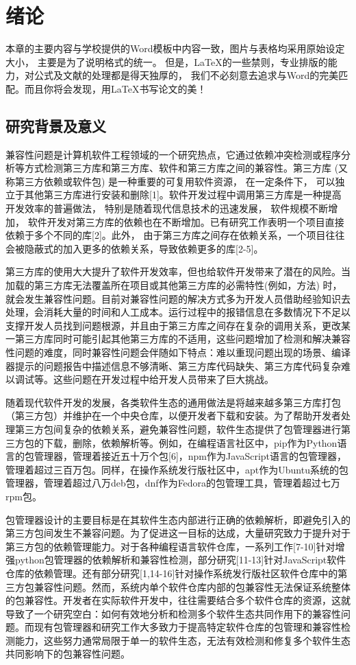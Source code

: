 \chapter{绪论}

本章的主要内容与学校提供的Word模板中内容一致，图片与表格均采用原始设定大小，%
主要是为了说明格式的统一。%
但是，\LaTeX{}的一些禁则，专业排版的能力，对公式及文献的处理都是得天独厚的，%
我们不必刻意去追求与Word的完美匹配。而且你将会发现，用\LaTeX{}书写论文的美！ %

\section{研究背景及意义}
兼容性问题是计算机软件工程领域的一个研究热点，它通过依赖冲突检测或程序分析等方式检测第三方库和第三方库、软件和第三方库之间的兼容性。第三方库 (又称第三方依赖或软件包) 是一种重要的可复用软件资源， 在一定条件下， 可以独立于其他第三方库进行安装和删除[1]。软件开发过程中调用第三方库是一种提高开发效率的普遍做法， 特别是随着现代信息技术的迅速发展， 软件规模不断增加， 软件开发对第三方库的依赖也在不断增加。已有研究工作表明一个项目直接依赖于多个不同的库[2]。此外， 由于第三方库之间存在依赖关系，一个项目往往会被隐蔽式的加入更多的依赖关系，导致依赖更多的库[2-5]。

第三方库的使用大大提升了软件开发效率，但也给软件开发带来了潜在的风险。当加载的第三方库无法覆盖所在项目或其他第三方库的必需特性(例如，方法) 时，就会发生兼容性问题。目前对兼容性问题的解决方式多为开发人员借助经验知识去处理，会消耗大量的时间和人工成本。运行过程中的报错信息在多数情况下不足以支撑开发人员找到问题根源，并且由于第三方库之间存在复杂的调用关系，更改某一第三方库同时可能引起其他第三方库的不适用，这些问题增加了检测和解决兼容性问题的难度，同时兼容性问题会伴随如下特点：难以重现问题出现的场景、编译器提示的问题报告中描述信息不够清晰、第三方库代码缺失、第三方库代码复杂难以调试等。这些问题在开发过程中给开发人员带来了巨大挑战。

随着现代软件开发的发展，各类软件生态的通用做法是将越来越多第三方库打包（第三方包）并维护在一个中央仓库，以便开发者下载和安装。为了帮助开发者处理第三方包间复杂的依赖关系，避免兼容性问题，软件生态提供了包管理器进行第三方包的下载，删除，依赖解析等。例如，在编程语言社区中，pip作为Python语言的包管理器，管理着接近五十万个包[6]，npm作为JavaScript语言的包管理器，管理着超过三百万包。同样，在操作系统发行版社区中，apt作为Ubuntu系统的包管理器，管理着超过八万deb包，dnf作为Fedora的包管理工具，管理着超过七万rpm包。

包管理器设计的主要目标是在其软件生态内部进行正确的依赖解析，即避免引入的第三方包间发生不兼容问题。为了促进这一目标的达成，大量研究致力于提升对于第三方包的依赖管理能力。对于各种编程语言软件仓库，一系列工作[7-10]针对增强python包管理器的依赖解析和兼容性检测，部分研究[11-13]针对JavaScript软件仓库的依赖管理。还有部分研究[1,14-16]针对操作系统发行版社区软件仓库中的第三方包兼容性问题。然而，系统内单个软件仓库内部的包兼容性无法保证系统整体的包兼容性。开发者在实际软件开发中，往往需要结合多个软件仓库的资源，这就导致了一个研究空白：如何有效地分析和检测多个软件生态共同作用下的兼容性问题。而现有包管理器和研究工作大多致力于提高特定软件仓库的包管理和兼容性检测能力，这些努力通常局限于单一的软件生态，无法有效检测和修复多个软件生态共同影响下的包兼容性问题。

